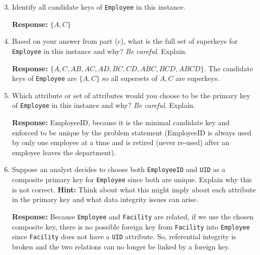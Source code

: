 \documentclass{report}
\renewcommand{\it}[1]{\textit{{#1}}}
\renewcommand{\bf}[1]{\textbf{{#1}}}
\renewcommand{\tt}[1]{\texttt{{#1}}}
\begin{document}
\begin{enumerate}[label=(\alph*)]
    \setcounter{enumi}{2}
    \item Identify all candidate keys of \tt{Employee} in this instance. \vspace{2pt}

        \bf{Response:} $\{A, C\}$

    \item Based on your answer from part (c), what is the full set of superkeys for
        \tt{Employee} in this instance and why? \it{Be careful}. Explain. \vspace{2pt}

        \bf{Response:} $\{A, C, AB, AC, AD, BC, CD, ABC, BCD, ABCD\}$. The candidate keys of \tt{Employee} are
        $\{A, C\}$ so all supersets of $A, C$ are superkeys.

    \item Which attribute or set of attributes would you choose to be the primary key of 
        \tt{Employee} in this instance and why? \it{Be careful}. Explain. \vspace{2pt}

        \bf{Response:} EmployeeID, because it is the minimal candidate key and enforced to
        be unique by the problem statement (EmployeeID is always used by only one employee at a time 
        and is retired (never re-used) after an employee leaves the department).

    \item Suppose an analyst decides to choose both \tt{EmployeeID} and \tt{UID} 
        as a composite primary key for \tt{Employee} since both are unique. Explain why 
        this is not correct. \bf{Hint:} Think about what this might imply about each 
        attribute in the primary key and what data integrity issues can arise. \vspace{2pt}

        \bf{Response:} Because \tt{Employee} and \tt{Facility} are related, if we use the chosen
        composite key, there is no possible foreign key from \tt{Facility} into \tt{Employee} since 
        \tt{Facility} does not have a \tt{UID} attribute. So, referential integrity is broken and
        the two relations can no longer be linked by a foreign key.


\end{enumerate}
\end{document}
